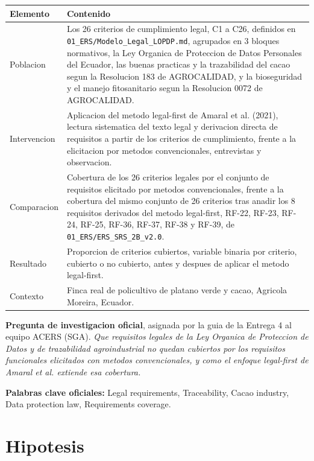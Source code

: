 \documentclass[11pt,a4paper]{article}
\begin{document}
\begin{longtable}{L{2.6cm} L{12.4cm}}
\toprule
\textbf{Elemento} & \textbf{Contenido} \\
\midrule
\endhead
Poblacion & Los 26 criterios de cumplimiento legal, C1 a C26, definidos en \texttt{01\_ERS/Modelo\_Legal\_LOPDP.md}, agrupados en 3 bloques normativos, la Ley Organica de Proteccion de Datos Personales del Ecuador, las buenas practicas y la trazabilidad del cacao segun la Resolucion 183 de AGROCALIDAD, y la bioseguridad y el manejo fitosanitario segun la Resolucion 0072 de AGROCALIDAD. \\
\addlinespace
Intervencion & Aplicacion del metodo legal-first de Amaral et al. (2021), lectura sistematica del texto legal y derivacion directa de requisitos a partir de los criterios de cumplimiento, frente a la elicitacion por metodos convencionales, entrevistas y observacion. \\
\addlinespace
Comparacion & Cobertura de los 26 criterios legales por el conjunto de requisitos elicitado por metodos convencionales, frente a la cobertura del mismo conjunto de 26 criterios tras anadir los 8 requisitos derivados del metodo legal-first, RF-22, RF-23, RF-24, RF-25, RF-36, RF-37, RF-38 y RF-39, de \texttt{01\_ERS/ERS\_SRS\_2B\_v2.0}. \\
\addlinespace
Resultado & Proporcion de criterios cubiertos, variable binaria por criterio, cubierto o no cubierto, antes y despues de aplicar el metodo legal-first. \\
\addlinespace
Contexto & Finca real de policultivo de platano verde y cacao, Agricola Moreira, Ecuador. \\
\bottomrule
\end{longtable}

\textbf{Pregunta de investigacion oficial}, asignada por la guia de la Entrega 4 al equipo ACERS (SGA). \textit{Que requisitos legales de la Ley Organica de Proteccion de Datos y de trazabilidad agroindustrial no quedan cubiertos por los requisitos funcionales elicitados con metodos convencionales, y como el enfoque legal-first de Amaral et al. extiende esa cobertura.}

\textbf{Palabras clave oficiales:} Legal requirements, Traceability, Cacao industry, Data protection law, Requirements coverage.

\section{Hipotesis}
\end{document}
